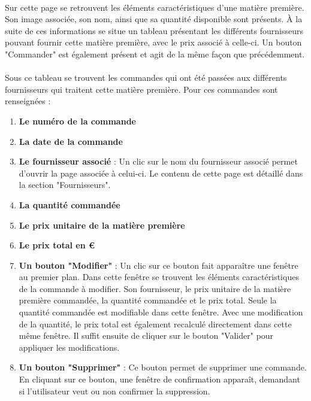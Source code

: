 \paragraph{}
Sur cette page se retrouvent les éléments caractéristiques d'une matière 
première. Son image associée, son nom, ainsi que sa quantité disponible sont 
présents. À la suite de ces informations se situe un tableau présentant les 
différents fournisseurs pouvant fournir cette matière première, avec le prix 
associé à celle-ci. Un bouton "Commander" est également présent et agit de la 
même façon que précédemment.

\paragraph{}
Sous ce tableau se trouvent les commandes qui ont été passées aux différents 
fournisseurs qui traitent cette matière première. Pour ces commandes sont 
renseignées :
\begin{enumerate}
  \item \textbf{Le numéro de la commande}
  \item \textbf{La date de la commande}
  \item \textbf{Le fournisseur associé} : Un clic sur le nom du fournisseur 
  associé permet d'ouvrir la page associée à celui-ci. Le contenu de cette page 
  est détaillé dans la section "Fournisseurs".
  \item \textbf{La quantité commandée}
  \item \textbf{Le prix unitaire de la matière première}
  \item \textbf{Le prix total en €}
  \item \textbf{Un bouton "Modifier"} : Un clic sur ce bouton fait apparaître 
  une fenêtre au premier plan. Dans cette fenêtre se trouvent les éléments 
  caractéristiques de la commande à modifier. Son fournisseur, le prix unitaire 
  de la matière première commandée, la quantité commandée et le prix total.
  Seule la quantité commandée est modifiable dans cette fenêtre. Avec une 
  modification de la quantité, le prix total est également recalculé 
  directement dans cette même fenêtre. Il suffit ensuite de cliquer sur le 
  bouton "Valider" pour appliquer les modifications.

  \item \textbf{Un bouton "Supprimer"} : Ce bouton permet de supprimer une 
  commande. En cliquant sur ce bouton, une fenêtre de confirmation apparaît, 
  demandant si l'utilisateur veut ou non confirmer la suppression.
\end{enumerate}

